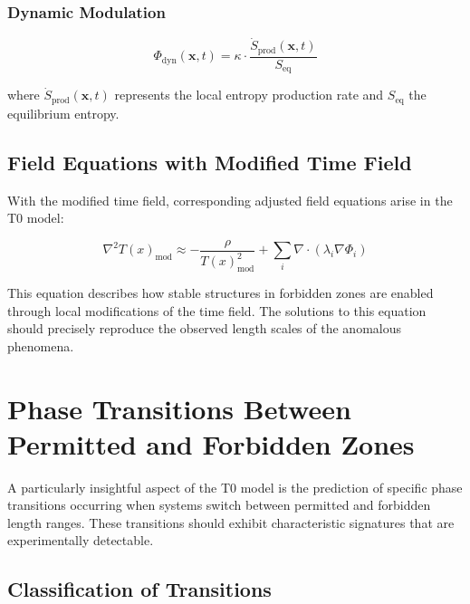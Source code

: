 \documentclass[12pt,a4paper]{article}
\newcommand{\Tfield}{T(x)}
\begin{document}
	\subsubsection{Dynamic Modulation}
	\label{subsubsec:dyn_modulation}
	
	\begin{equation}
		\Phi_{\text{dyn}}(\mathbf{x}, t) = \kappa \cdot \frac{\dot{S}_{\text{prod}}(\mathbf{x}, t)}{S_{\text{eq}}}
	\end{equation}
	
	where $\dot{S}_{\text{prod}}(\mathbf{x}, t)$ represents the local entropy production rate and $S_{\text{eq}}$ the equilibrium entropy.
	
	\subsection{Field Equations with Modified Time Field}
	\label{subsec:feldgleichungen}
	
	With the modified time field, corresponding adjusted field equations arise in the T0 model:
	
	\begin{equation}
		\nabla^2\Tfield_{\text{mod}} \approx -\frac{\rho}{\Tfield_{\text{mod}}^2} + \sum_i \nabla \cdot \left( \lambda_i \nabla \Phi_i \right)
	\end{equation}
	
	This equation describes how stable structures in forbidden zones are enabled through local modifications of the time field. The solutions to this equation should precisely reproduce the observed length scales of the anomalous phenomena.
	
	\section{Phase Transitions Between Permitted and Forbidden Zones}
	\label{sec:phasenuebergaenge}
	
	A particularly insightful aspect of the T0 model is the prediction of specific phase transitions occurring when systems switch between permitted and forbidden length ranges. These transitions should exhibit characteristic signatures that are experimentally detectable.
	
	\subsection{Classification of Transitions}
	\label{subsec:klassifizierung_uebergaenge}
	
\end{document}
